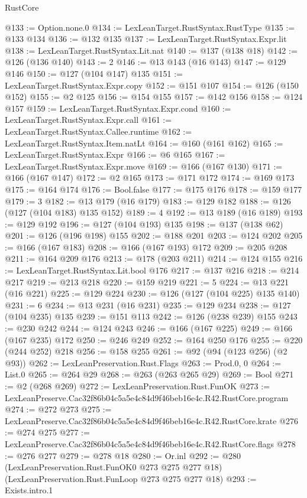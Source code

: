 \begin{lexlean}{RustCore}
\begin{coremodule}
@133 := Option.none.{0}
@134 := LexLeanTarget.RustSyntax.RustType
@135 := @133 @134
@136 := @132 @135
@137 := LexLeanTarget.RustSyntax.Expr.lit
@138 := LexLeanTarget.RustSyntax.Lit.nat
@140 := @137 (@138 @18)
@142 := @126 (@136 @140)
@143 := 2
@146 := @13 @143 (@16 @143)
@147 := @129 @146
@150 := @127 (@104 @147) @135
@151 := LexLeanTarget.RustSyntax.Expr.copy
@152 := @151 @107
@154 := @126 (@150 @152)
@155 := @2 @125
@156 := @154 @155
@157 := @142 @156
@158 := @124 @157
@159 := LexLeanTarget.RustSyntax.Expr.cond
@160 := LexLeanTarget.RustSyntax.Expr.call
@161 := LexLeanTarget.RustSyntax.Callee.runtime
@162 := LexLeanTarget.RustSyntax.Item.natLt
@164 := @160 (@161 @162)
@165 := LexLeanTarget.RustSyntax.Expr
@166 := @6 @165
@167 := LexLeanTarget.RustSyntax.Expr.move
@169 := @166 (@167 @130)
@171 := @166 (@167 @147)
@172 := @2 @165
@173 := @171 @172
@174 := @169 @173
@175 := @164 @174
@176 := Bool.false
@177 := @175 @176
@178 := @159 @177
@179 := 3
@182 := @13 @179 (@16 @179)
@183 := @129 @182
@188 := @126 (@127 (@104 @183) @135 @152)
@189 := 4
@192 := @13 @189 (@16 @189)
@193 := @129 @192
@196 := @127 (@104 @193) @135
@198 := @137 (@138 @62)
@201 := @126 (@196 @198) @155
@202 := @188 @201
@203 := @124 @202
@205 := @166 (@167 @183)
@208 := @166 (@167 @193) @172
@209 := @205 @208
@211 := @164 @209 @176
@213 := @178 (@203 @211)
@214 := @124 @155
@216 := LexLeanTarget.RustSyntax.Lit.bool @176
@217 := @137 @216
@218 := @214 @217
@219 := @213 @218
@220 := @159 @219
@221 := 5
@224 := @13 @221 (@16 @221)
@225 := @129 @224
@230 := @126 (@127 (@104 @225) @135 @140)
@231 := 6
@234 := @13 @231 (@16 @231)
@235 := @129 @234
@238 := @127 (@104 @235) @135
@239 := @151 @113
@242 := @126 (@238 @239) @155
@243 := @230 @242
@244 := @124 @243
@246 := @166 (@167 @225)
@249 := @166 (@167 @235) @172
@250 := @246 @249
@252 := @164 @250 @176
@255 := @220 (@244 @252) @218
@256 := @158 @255
@261 := @92 (@94 (@123 @256) (@2 @93))
@262 := LexLeanPreservation.Rust.Flags
@263 := Prod.{0, 0}
@264 := List.{0}
@265 := @264 @29
@268 := @263 (@263 @265 @29)
@269 := Bool
@271 := @2 (@268 @269)
@272 := LexLeanPreservation.Rust.FunOK
@273 := LexLeanPreserve.Cac32f86b04c5a5e4c84d9f46beb16e4c.R42.RustCore.program
@274 := @272 @273
@275 := LexLeanPreserve.Cac32f86b04c5a5e4c84d9f46beb16e4c.R42.RustCore.krate
@276 := @274 @275
@277 := LexLeanPreserve.Cac32f86b04c5a5e4c84d9f46beb16e4c.R42.RustCore.flags
@278 := @276 @277
@279 := @278 @18
@280 := Or.inl
@292 := @280
    (LexLeanPreservation.Rust.FunOK0 @273 @275 @277 @18)
    (LexLeanPreservation.Rust.FunLoop @273 @275 @277 @18)
@293 := Exists.intro.{1}

\end{coremodule}
\end{lexlean}
